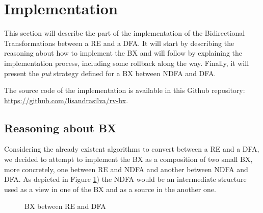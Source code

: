 \section{Implementation}
This section will describe the part of the implementation of the Bidirectional Transformations between a RE and a DFA. It will start by describing the reasoning about how to implement the BX and will follow by explaining the implementation process, including some rollback along the way. Finally, it will present the \textit{put} strategy defined for a BX between NDFA and DFA.

The source code of the implementation is available in this Github repository:  \url{https://github.com/lisandrasilva/rv-bx}.

\subsection{Reasoning about BX}
Considering the already existent algorithms to convert between a RE and a DFA, we decided to attempt to implement the BX as a composition of two small BX, more concretely, one between RE and NDFA and another between NDFA and DFA. As depicted in Figure \ref{fig:BX}) the NDFA would be an intermediate structure used as a view in one of the BX and as a source in the another one.  

\begin{figure}
    \centering
    \caption{BX between RE and DFA}
    \label{fig:BX}
\end{figure}

